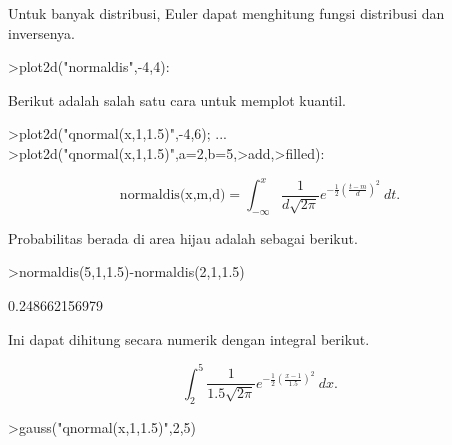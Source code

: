 \documentclass[12pt,arial,letterpaper]{book}
\begin{document}
\begin{eulercomment}
\begin{eulercomment}
\begin{eulercomment}
\begin{eulercomment}
\begin{eulercomment}
\begin{eulercomment}
\begin{eulercomment}
\begin{eulercomment}
\begin{eulercomment}
\begin{eulercomment}
\begin{eulercomment}
\begin{eulercomment}
\begin{eulercomment}
\begin{eulercomment}
\begin{eulercomment}
\begin{eulercomment}
\begin{eulercomment}
\begin{eulercomment}
\begin{eulercomment}
\begin{eulercomment}
\begin{eulercomment}
\begin{eulercomment}
\begin{eulercomment}
\begin{eulercomment}
\begin{eulercomment}
\begin{eulercomment}
\begin{eulercomment}
\begin{eulercomment}
\begin{eulercomment}
\begin{eulercomment}
\begin{eulercomment}
\begin{eulercomment}
\begin{eulercomment}
Untuk banyak distribusi, Euler dapat menghitung fungsi distribusi dan
inversenya.
\end{eulercomment}
\begin{eulerprompt}
>plot2d("normaldis",-4,4): 
\end{eulerprompt}
\begin{eulercomment}
Berikut adalah salah satu cara untuk memplot kuantil.
\end{eulercomment}
\begin{eulerprompt}
>plot2d("qnormal(x,1,1.5)",-4,6);  ...
>plot2d("qnormal(x,1,1.5)",a=2,b=5,>add,>filled):
\end{eulerprompt}
\begin{eulerformula}
\[
\text{normaldis(x,m,d)}=\int_{-\infty}^x \frac{1}{d\sqrt{2\pi}}e^{-\frac{1}{2}(\frac{t-m}{d})^2}\ dt.
\]
\end{eulerformula}
\begin{eulercomment}
Probabilitas berada di area hijau adalah sebagai berikut.
\end{eulercomment}
\begin{eulerprompt}
>normaldis(5,1,1.5)-normaldis(2,1,1.5)
\end{eulerprompt}
\begin{euleroutput}
  0.248662156979
\end{euleroutput}
\begin{eulercomment}
Ini dapat dihitung secara numerik dengan integral berikut.\\
\end{eulercomment}
\begin{eulerformula}
\[
\int_2^5 \frac{1}{1.5\sqrt{2\pi}}e^{-\frac{1}{2}(\frac{x-1}{1.5})^2}\ dx.
\]
\end{eulerformula}
\begin{eulerprompt}
>gauss("qnormal(x,1,1.5)",2,5)

\end{eulerprompt}
\end{eulercomment}
\end{eulercomment}
\end{eulercomment}
\end{eulercomment}
\end{eulercomment}
\end{eulercomment}
\end{eulercomment}
\end{eulercomment}
\end{eulercomment}
\end{eulercomment}
\end{eulercomment}
\end{eulercomment}
\end{eulercomment}
\end{eulercomment}
\end{eulercomment}
\end{eulercomment}
\end{eulercomment}
\end{eulercomment}
\end{eulercomment}
\end{eulercomment}
\end{eulercomment}
\end{eulercomment}
\end{eulercomment}
\end{eulercomment}
\end{eulercomment}
\end{eulercomment}
\end{eulercomment}
\end{eulercomment}
\end{eulercomment}
\end{eulercomment}
\end{eulercomment}
\end{eulercomment}
\end{document}
